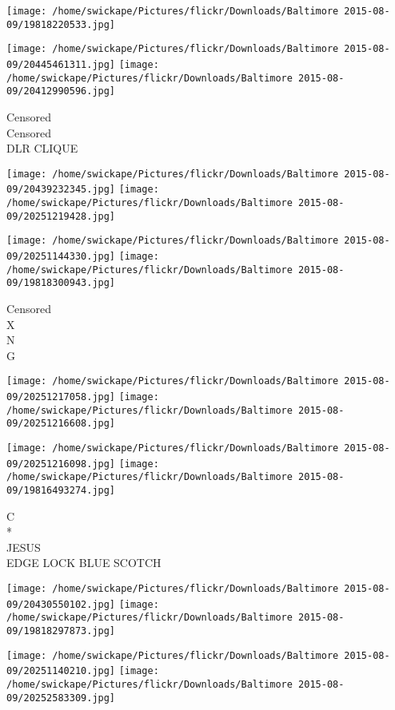 \documentclass[10pt,letterpaper]{article}
\begin{document}
\texttt{[image: /home/swickape/Pictures/flickr/Downloads/Baltimore 2015-08-09/19818220533.jpg]}

\vspace{0.25in}
\texttt{[image: /home/swickape/Pictures/flickr/Downloads/Baltimore 2015-08-09/20445461311.jpg]}
\texttt{[image: /home/swickape/Pictures/flickr/Downloads/Baltimore 2015-08-09/20412990596.jpg]}

Censored\\
Censored\\
DLR CLIQUE\\
\pagebreak

\texttt{[image: /home/swickape/Pictures/flickr/Downloads/Baltimore 2015-08-09/20439232345.jpg]}
\texttt{[image: /home/swickape/Pictures/flickr/Downloads/Baltimore 2015-08-09/20251219428.jpg]}

\texttt{[image: /home/swickape/Pictures/flickr/Downloads/Baltimore 2015-08-09/20251144330.jpg]}
\texttt{[image: /home/swickape/Pictures/flickr/Downloads/Baltimore 2015-08-09/19818300943.jpg]}

Censored\\
X\\
N\\
G\\
\pagebreak

\texttt{[image: /home/swickape/Pictures/flickr/Downloads/Baltimore 2015-08-09/20251217058.jpg]}
\texttt{[image: /home/swickape/Pictures/flickr/Downloads/Baltimore 2015-08-09/20251216608.jpg]}

\texttt{[image: /home/swickape/Pictures/flickr/Downloads/Baltimore 2015-08-09/20251216098.jpg]}
\texttt{[image: /home/swickape/Pictures/flickr/Downloads/Baltimore 2015-08-09/19816493274.jpg]}

C\\
*\\
JESUS\\
EDGE LOCK BLUE SCOTCH\\
\pagebreak

\texttt{[image: /home/swickape/Pictures/flickr/Downloads/Baltimore 2015-08-09/20430550102.jpg]}
\texttt{[image: /home/swickape/Pictures/flickr/Downloads/Baltimore 2015-08-09/19818297873.jpg]}

\texttt{[image: /home/swickape/Pictures/flickr/Downloads/Baltimore 2015-08-09/20251140210.jpg]}
\texttt{[image: /home/swickape/Pictures/flickr/Downloads/Baltimore 2015-08-09/20252583309.jpg]}
\end{document}
